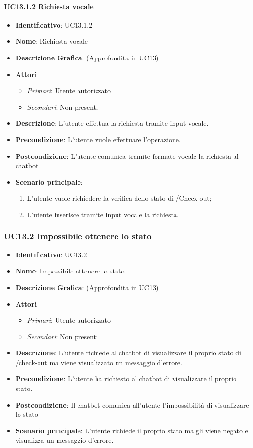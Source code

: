 \paragraph{UC13.1.2 Richiesta vocale}
\begin{itemize}
	\item \textbf{Identificativo}: UC13.1.2
	\item \textbf{Nome}: Richiesta vocale
	\item \textbf{Descrizione Grafica}: (Approfondita in UC13)
	\item \textbf{Attori}
	\begin{itemize}
		\item \textit{Primari}: Utente autorizzato
		\item \textit{Secondari}: Non presenti
	\end{itemize}
	\item \textbf{Descrizione}: L'utente effettua la richiesta tramite input vocale.
	\item \textbf{Precondizione}: L'utente vuole effettuare l'operazione.
	\item \textbf{Postcondizione}: L'utente comunica tramite formato vocale la richiesta al chatbot.
	\item \textbf{Scenario principale}: 
	\begin{enumerate}
		\item L'utente vuole richiedere la verifica dello stato di /Check-out;
		\item L'utente inserisce tramite input vocale la richiesta.
	\end{enumerate}
\end{itemize}

\subsubsection{UC13.2 Impossibile ottenere lo stato}
\begin{itemize}
	\item \textbf{Identificativo}: UC13.2
	\item \textbf{Nome}: Impossibile ottenere lo stato
	\item \textbf{Descrizione Grafica}: (Approfondita in UC13)
	\item \textbf{Attori}
	\begin{itemize}
		\item \textit{Primari}: Utente autorizzato
		\item \textit{Secondari}: Non presenti
	\end{itemize}
	\item \textbf{Descrizione}: L'utente richiede al chatbot di visualizzare il proprio stato di /check-out ma viene visualizzato un messaggio d'errore.
	\item \textbf{Precondizione}: L'utente ha richiesto al chatbot di visualizzare il proprio stato.
	\item \textbf{Postcondizione}: Il chatbot comunica all'utente l'impossibilità di visualizzare lo stato.
	\item \textbf{Scenario principale}: L'utente richiede il proprio stato ma gli viene negato e visualizza un messaggio d'errore.
\end{itemize}
